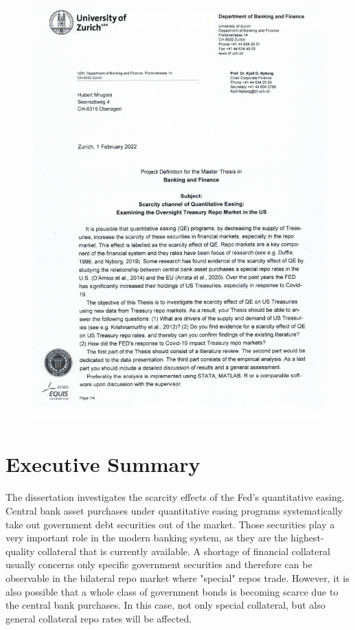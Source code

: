\documentclass[11pt,a4paper,english,oneside]{article}
\begin{document}
\begin{figure}[h!]
  \begin{center}
    \includegraphics[page=4,width=.86\textwidth]{../../project_definition.pdf}
  \end{center}
\end{figure}

\thispagestyle{firststyle}
\newpage

\section*{Executive Summary}
\thispagestyle{firststyle}

The dissertation investigates the scarcity effects of the Fed's quantitative easing. Central bank asset purchases under quantitative easing programs systematically take out government debt securities out of the market. Those securities play a very important role in the modern banking system, as they are the highest-quality collateral that is currently available. A shortage of financial collateral usually concerns only specific government securities and therefore can be observable in the bilateral repo market where "special" repos trade. However, it is also possible that a whole class of government bonds is becoming scarce due to the central bank purchases. In this case, not only special collateral, but also general collateral repo rates will be affected.
\end{document}
